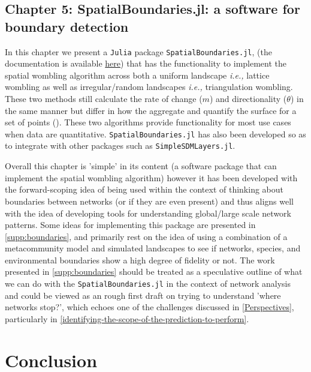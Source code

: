 \begin{refsection}
\subsection{Chapter 5: SpatialBoundaries.jl: a software for boundary detection}

In this chapter we present a \texttt{Julia} package \texttt{SpatialBoundaries.jl}, (the documentation is available \href{https://poisotlab.github.io/SpatialBoundaries.jl/dev/}{here}) that has the functionality to implement the spatial wombling algorithm across both a uniform landscape \emph{i.e.,} lattice wombling as well as irregular/random landscapes \emph{i.e.,} triangulation wombling. These two methods still calculate the rate of change (\(m\)) and directionality (\(\theta\)) in the same manner but differ in how the aggregate and quantify the surface for a set of points (\cite{Fortin2005SpaAna}). These two algorithms provide functionality for most use cases when data are quantitative. \texttt{SpatialBoundaries.jl} has also been developed so as to integrate with other packages such as \texttt{SimpleSDMLayers.jl}.

Overall this chapter is 'simple' in its content (a software package that can implement the spatial wombling algorithm) however it has been developed with the forward-scoping idea of being used within the context of thinking about boundaries between networks (or if they are even present) and thus aligns well with the idea of developing tools for understanding global/large scale network patterns. Some ideas for implementing this package are presented in \autoref{supp:boundaries}, and primarily rest on the idea of using a combination of a metacommunity model and simulated landscapes to see if networks, species, and environmental boundaries show a high degree of fidelity or not. The work presented in \autoref{supp:boundaries} should be treated as a speculative outline of what we can do with the \texttt{SpatialBoundaries.jl} in the context of network analysis and could be viewed as an rough first draft on trying to understand 'where networks stop?', which echoes one of the challenges discussed in \autoref{Perspectives}, particularly in \autoref{identifying-the-scope-of-the-prediction-to-perform}.

\section{Conclusion}\label{conclusion}


\end{refsection}
